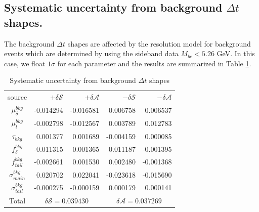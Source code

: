 \subsection{Systematic uncertainty from background $\Delta t$ shapes.}
The background $\Delta t$ shapes are affected by the resolution model for background events which are
determined by using the sideband data $M_{bc}<5.26$ GeV. In this case, we float $1\sigma$ for each parameter and the results are summarized in Table \ref{tab:sy_bkgt}.
\begin{table}[htpb]
	\begin{minipage}[b]{1.0\linewidth}
		\centering
		\caption{Systematic uncertainty from background $\Delta t$ shapes}
		\label{tab:sy_bkgt}
		\begin{tabular}{c r r r r}
			\hline
			source & $+\delta \mathcal{S}$ & $+\delta \mathcal{A}$ & $-\delta \mathcal{S}$ &  $-\delta \mathcal{A}$\\
			$\mu^{bkg}_{\delta}$ & -0.014294
			& -0.016581
			& 0.006758
			& 0.006537
			\\
			$\mu^{bkg}_{l}$&  -0.002798
			& -0.012567
			& 0.003789
			& 0.012783
			\\
			$\tau_{bkg}$ & 0.001377
			& 0.001689
			& -0.004159
			& 0.000085\\
			$f_{\delta}^{bkg}$ &  -0.011315
			& 0.001365
			& 0.011187
			& -0.001395
			\\
			$f^{bkg}_{tail}$  &-0.002661
			& 0.001530
			& 0.002480
			& -0.001368
			\\
			$\sigma^{bkg}_{main}$ & 0.020702
			& 0.022041
			& -0.023618
			& -0.015690
			\\
			$\sigma^{bkg}_{tail}$ & -0.000275 & -0.000159
			& 0.000179
			& 0.000141
			\\
			\hline
			Total &
			\multicolumn{2}{c}{$\delta \mathcal{S}=0.039430$} &
			\multicolumn{2}{c}{$\delta \mathcal{A}=0.037269$}\\
			\hline
		\end{tabular}
	\end{minipage}
\end{table}

